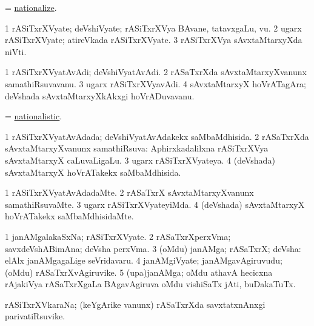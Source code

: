 \bentry
{}
\gl{\sakirx}
\bmng
= \hyperlink{nationalize}{nationalize}. 
\emng
\eentry

\bentry
{}
\gl{\nA}
\bmng
\bnum
\num{1} rASiTxrXVyate; deVshiVyate; rASiTxrXVya BAvane, tatavxgaLu, \mo vu. 
\num{2} ugarx rASiTxrXVyate; atireVkada rASiTxrXVyate. 
\num{3} rASiTxrXVya sAvxtaMtarxyXda niVti. 
\enum
\emng
\eentry

\bentry
{}
\gl{\nA}
\bmng
\bnum
\num{1} rASiTxrXVyatAvAdi; deVshiVyatAvAdi. 
\num{2} rASaTxrXda sAvxtaMtarxyXvanunx samathiRsuvavanu. 
\num{3} ugarx rASiTxrXVyavAdi. 
\num{4} sAvxtaMtarxyX hoVrATagAra; deVshada sAvxtaMtarxyXkAkxgi hoVrADuvavanu. 
\enum
\emng
\eentry

\bentry
{}
\gl{\gu}
\bmng
= \hyperlink{nationalistic}{nationalistic}. 
\emng
\eentry

\bentry
{}
\gl{\gu}
\bmng
\bnum
\num{1} rASiTxrXVyatAvAdada; deVshiVyatAvAdakekx saMbaMdhisida. 
\num{2} rASaTxrXda sAvxtaMtarxyXvanunx samathiRsuva:  Aphirxkadalilxna rASiTxrXVya sAvxtaMtarxyX caLuvaLigaLu. 
\num{3} ugarx rASiTxrXVyateya. 
\num{4} (deVshada) sAvxtaMtarxyX hoVrATakekx saMbaMdhisida. 
\enum
\emng
\eentry

\bentry
{}
\gl{\kirxvi}
\bmng
\bnum
\num{1} rASiTxrXVyatAvAdadaMte. 
\num{2} rASaTxrX sAvxtaMtarxyXvanunx samathiRsuvaMte. 
\num{3} ugarx rASiTxrXVyateyiMda. 
\num{4} (deVshada) sAvxtaMtarxyX hoVrATakekx saMbaMdhisidaMte. 
\enum
\emng
\eentry

\bentry
{}
\gl{\nA}
\bmng
\bnum
\num{1} janAMgalakaSxNa; rASiTxrXVyate. 
\num{2} rASaTxrXperxVma; savxdeVshABimAna; deVsha perxVma. 
\num{3} (oMdu) janAMga; rASaTxrX; deVsha:  elAlx janAMgagaLige seVridavaru. 
\num{4} janAMgiVyate; janAMgavAgiruvudu; (oMdu) rASaTxrXvAgiruvike. 
\num{5} (upa)janAMga; oMdu athavA hecicxna rAjakiVya rASaTxrXgaLa BAgavAgiruva oMdu vishiSaTx jAti, buDakaTuTx. 
\enum
\emng
\eentry

\bentry
{}
\gl{\nA}
\bmng
rASiTxrXVkaraNa; (keYgArike \mo vanunx) rASaTxrXda savxtatxnAnxgi parivatiRsuvike. 
\emng
\eentry

